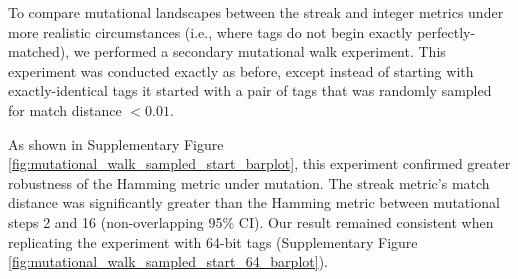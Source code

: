 To compare mutational landscapes between the streak and integer metrics under more realistic circumstances (i.e., where tags do not begin exactly perfectly-matched), we performed a secondary mutational walk experiment.
This experiment was conducted exactly as before, except instead of starting with exactly-identical tags it started with a pair of tags that was randomly sampled for match distance $<0.01$.

As shown in Supplementary Figure \ref{fig:mutational_walk_sampled_start_barplot}, this experiment confirmed greater robustness of the Hamming metric under mutation.
The streak metric's match distance was significantly greater than the Hamming metric between mutational steps 2 and 16 (non-overlapping 95\% CI).
Our result remained consistent when replicating the experiment with 64-bit tags (Supplementary Figure \ref{fig:mutational_walk_sampled_start_64_barplot}).
